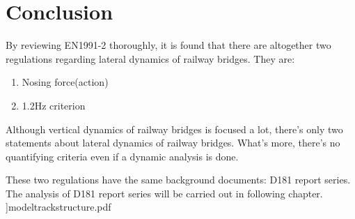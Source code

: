 \section{Conclusion}

By reviewing EN1991-2 thoroughly, it is found that there are altogether two regulations regarding lateral dynamics of railway bridges. They are:

\begin{enumerate}
	\item Nosing force(action)
	\item 1.2Hz criterion 
\end{enumerate}

Although vertical dynamics of railway bridges is focused a lot, there's only two statements about lateral dynamics of railway bridges. What's more, there's no quantifying criteria even if a dynamic analysis is done. 

These two regulations have the same background documents: D181 report series. The analysis of D181 report series will be carried out in following chapter.
]{modeltrackstructure.pdf}






